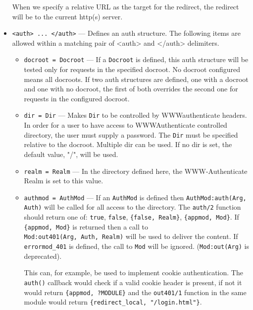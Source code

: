 \documentclass[11pt,oneside,english]{book}
\begin{document}
\begin{itemize}
              When we specify a relative URL as the target for the
              redirect, the redirect will be to the current http(s) server.

\item       \verb+<auth> ... </auth>+ ---
              Defines an auth structure.  The following items are allowed within
              a matching pair of <auth> and </auth> delimiters.

              \begin{itemize}
              \item \verb+docroot = Docroot+ --- If a \verb+Docroot+ is defined,
                this auth structure will be tested only for requests in the
                specified docroot. No docroot configured means all docroots.  If
                two auth structures are defined, one with a docroot and one with
                no docroot, the first of both overrides the second one for
                requests in the configured docroot.

              \item \verb+dir = Dir+ --- Makes \verb+Dir+ to be controlled by
                WWW\-authenticate headers. In order for a user to have access to
                WWW\-Authenticate controlled directory, the user must supply a
                password. The \verb+Dir+ must be specified relative to the
                docroot. Multiple dir can be used. If no dir is set, the default
                value, "/", will be used.

              \item \verb+realm = Realm+ --- In the directory defined here, the
                WWW-Authenticate Realm is set to this value.

              \item \verb+authmod = AuthMod+ --- If an \verb+AuthMod+ is defined
                then \verb+AuthMod:auth(Arg, Auth)+ will be called for all
                access to the directory. The \verb+auth/2+ function should
                return one of: \verb+true+, \verb+false+, \verb+{false, Realm}+,
                \verb+{appmod, Mod}+. If \verb+{appmod, Mod}+ is returned then a
                call to\\ \verb+Mod:out401(Arg, Auth, Realm)+ will be used to
                deliver the content. If \verb+errormod_401+ is defined, the call
                to \verb+Mod+ will be ignored. (\verb+Mod:out(Arg)+ is
                deprecated).

                This can, for example, be used to implement cookie
                authentication. The \verb+auth()+ callback would check if a
                valid cookie header is present, if not it would return
                \verb+{appmod, ?MODULE}+ and the \verb+out401/1+ function in the
                same module would return \verb+{redirect_local, "/login.html"}+.


\end{itemize}
\end{itemize}
\end{document}
